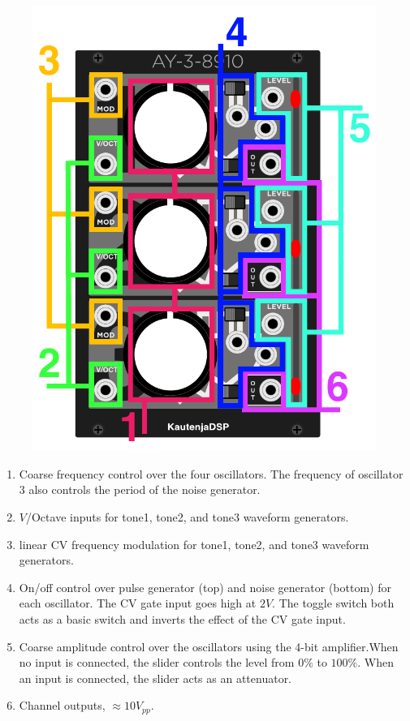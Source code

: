 \documentclass[12pt,letter]{article}
\begin{document}
\begin{figure}[!htp]
\centering
\includegraphics{AY_3_8910-Manual}
\end{figure}

\begin{enumerate}
  \item Coarse frequency control over the four oscillators. The frequency of oscillator 3 also controls the period of the noise generator.
  \item $V$/Octave inputs for tone1, tone2, and tone3 waveform generators.
  \item linear CV frequency modulation for tone1, tone2, and tone3 waveform generators.
  \item On/off control over pulse generator (top) and noise generator (bottom) for each oscillator. The CV gate input goes high at $2V$. The toggle switch both acts as a basic switch and inverts the effect of the CV gate input.
  \item Coarse amplitude control over the oscillators using the 4-bit amplifier.When no input is connected, the slider controls the level from $0\%$ to $100\%$. When an input is connected, the slider acts as an attenuator.
  \item Channel outputs, ${\approx}10V_{pp}$.
\end{enumerate}


\clearpage
\renewcommand\refname{References \& Acknowledgments}
\nocite{*}


\end{document}
